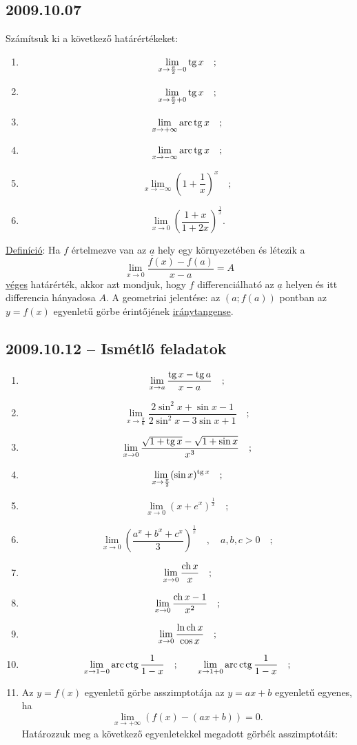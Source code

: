 \subsection*{2009.10.07}
Számítsuk ki a következő határértékeket:
\begin{enumerate}
\item $$\lim_{x\to \frac{\pi}{2}-0}\mathop{\mathrm{tg}}\nolimits x\quad;$$
\item $$\lim_{x\to \frac{\pi}{2}+0}\mathop{\mathrm{tg}}\nolimits x\quad;$$
\item $$\lim_{x\to +\infty}{\mathop{\mathrm{arc}}\nolimits\mathop{\mathrm{tg}}\nolimits x}\quad;$$
\item $$\lim_{x\to -\infty}{\mathop{\mathrm{arc}}\nolimits\mathop{\mathrm{tg}}\nolimits x}\quad;$$
\item $$\lim_{x\to -\infty}\left(1+\frac{1}{x}\right)^x\quad;$$
\item $$\lim_{x\to 0}\left(\frac{1+x}{1+2x}\right)^{\frac{1}{x}}.$$
\end{enumerate}

\noindent\underline{Definíció}: Ha $f$ értelmezve van az $\underline{a}$ hely egy környezetében és létezik a 
$$\lim_{x\to 0}\frac{f(x)-f(a)}{x-a}=A$$
\underline{véges} határérték, akkor azt mondjuk, hogy $f$ differenciálható az $\underline{a}$ helyen és itt differencia hányadosa $A$. A geometriai jelentése: az $(a;f(a))$ pontban az $y=f(x)$ egyenletű görbe érintőjének \underline{iránytangense}.
\subsection*{2009.10.12 -- Ismétlő feladatok}
\begin{enumerate}
\item $$\lim_{x\to a}\frac{\mathop{\mathrm{tg}}\nolimits x-\mathop{\mathrm{tg}}\nolimits a}{x-a}\quad;$$
\item $$\lim_{x\to \frac{\pi}{6}}\frac{2\sin ^2 x+\sin x-1}{2\sin ^2 x-3\sin x+1}\quad;$$
\item $$\lim_{x\to 0}\frac{\sqrt{1+\mathop{\mathrm{tg}}\nolimits x}-\sqrt{1+\sin x}}{x^3}\quad;$$
\item $$\lim_{x\to \frac{\pi}{2}}(\sin x)^{\mathop{\mathrm{tg}}\nolimits x}\quad;$$
\item $$\lim_{x\to 0}\left(x+e^x\right)^{\frac{1}{x}}\quad;$$
\item $$\lim_{x\to 0}\left(\frac{a^x+b^x+c^x}{3}\right)^{\frac{1}{x}}\quad,\quad a,b,c>0\quad;$$
\item $$\lim_{x\to 0}\frac{\mathop{\mathrm{ch}}\nolimits x}{x}\quad;$$
\item $$\lim_{x\to 0}\frac{\mathop{\mathrm{ch}}\nolimits x-1}{x^2}\quad;$$
\item $$\lim_{x\to 0}\frac{\ln \mathop{\mathrm{ch}}\nolimits x}{\cos x}\quad;$$
\item $$\lim_{x\to 1-0}\mathop{\mathrm{arc}}\nolimits\mathop{\mathrm{ctg}}\nolimits\frac{1}{1-x}\quad;\qquad\lim_{x\to 1+0}\mathop{\mathrm{arc}}\nolimits\mathop{\mathrm{ctg}}\nolimits\frac{1}{1-x}\quad;$$
\item Az $y=f(x)$ egyenletű görbe asszimptotája az $y=ax+b$ egyenletű egyenes, ha
$$\lim_{x\to +\infty}\left(f(x)-(ax+b)\right)=0.$$
Határozzuk meg a következő egyenletekkel megadott görbék asszimptotáit:
\end{enumerate}

